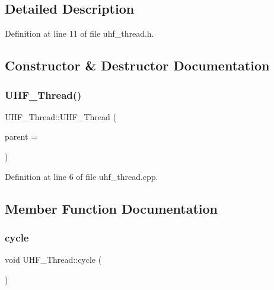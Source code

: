 \subsection{Detailed Description}


Definition at line 11 of file uhf\+\_\+thread.\+h.



\subsection{Constructor \& Destructor Documentation}
\mbox{\label{class_u_h_f___thread_a4e345d08f3f78642458925017371cac2}} 
\subsubsection{\texorpdfstring{UHF\_Thread()}{UHF\_Thread()}}
{\footnotesize\ttfamily U\+H\+F\+\_\+\+Thread\+::\+U\+H\+F\+\_\+\+Thread (\begin{DoxyParamCaption}\item[{Q\+Object $\ast$}]{parent = {} }\end{DoxyParamCaption})\hspace{0.3cm}{\ttfamily [explicit]}}



Definition at line 6 of file uhf\+\_\+thread.\+cpp.



\subsection{Member Function Documentation}
\mbox{\label{class_u_h_f___thread_a232f1c855e0b835beebcdb4a6b6a4484}} 
\subsubsection{\texorpdfstring{cycle}{cycle}}
{\footnotesize\ttfamily void U\+H\+F\+\_\+\+Thread\+::cycle (\begin{DoxyParamCaption}{ }\end{DoxyParamCaption})\hspace{0.3cm}{\ttfamily [signal]}}

